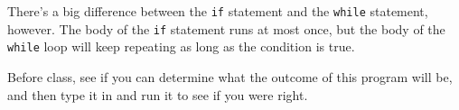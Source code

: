 There's a big difference between the \texttt{if} statement and the \texttt{while} statement, however.  The body of the \texttt{if} statement runs at most once, but the body of the \texttt{while} loop will keep repeating as long as the condition is true.

Before class, see if you can determine what the outcome of this program will be, and then type it in and run it to see if you were right.

